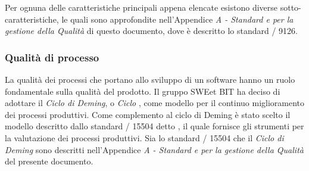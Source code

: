     Per ognuna delle caratteristiche principali appena elencate esistono diverse sotto-caratteristiche,
    le quali sono approfondite nell'Appendice \emph{A - Standard e  per la gestione della Qualità} di questo documento, dove è descritto lo standard / 9126.

    \subsubsection{Qualità di processo}
    La qualità dei processi che portano allo sviluppo di un software hanno un ruolo fondamentale sulla qualità del prodotto.
    Il gruppo SWEet BIT ha deciso di adottare il \emph{Ciclo di Deming}, o \emph{Ciclo} , come modello per il continuo miglioramento dei processi produttivi.
    Come complemento al ciclo di Deming è stato scelto il modello descritto dallo standard / 15504 detto ,
    il quale fornisce gli strumenti per la valutazione dei processi produttivi.
    Sia lo standard / 15504 che il \emph{Ciclo di Deming} sono descritti nell'Appendice \emph{A - Standard e  per la gestione della Qualità} del presente documento.

